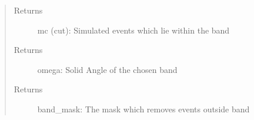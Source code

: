 \documentclass[letterpaper,10pt,english]{sphinxmanual}
\begin{document}
\begin{fulllineitems}
\begin{fulllineitems}
\begin{quote}
\begin{description}
\item[{Returns}] \leavevmode
mc (cut): Simulated events which lie within the band

\item[{Returns}] \leavevmode
omega: Solid Angle of the chosen band

\item[{Returns}] \leavevmode
band\_mask: The mask which removes events outside band

\end{description}\end{quote}

\end{fulllineitems}


\begin{fulllineitems}
\label{\detokenize{index:flarestack.core.injector.MCInjector.subclasses}}
\end{fulllineitems}


\end{fulllineitems}

\end{document}
